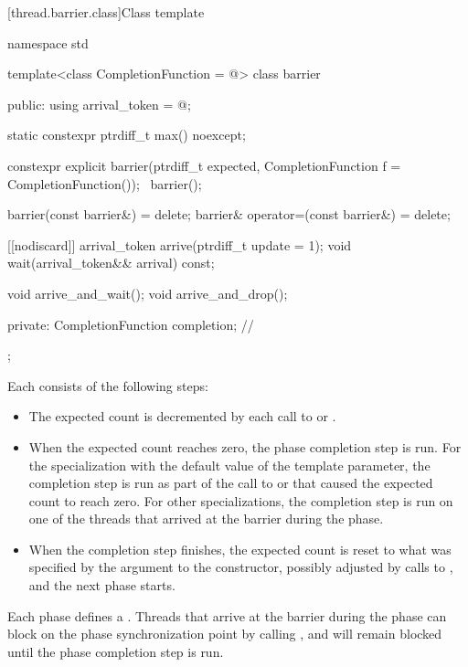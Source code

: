 [thread.barrier.class]{Class template }

\begin{codeblock}
namespace std {
  template<class CompletionFunction = @\seebelow@>
  class barrier {
  public:
    using arrival_token = @\seebelow@;

    static constexpr ptrdiff_t max() noexcept;

    constexpr explicit barrier(ptrdiff_t expected,
                               CompletionFunction f = CompletionFunction());
    ~barrier();

    barrier(const barrier&) = delete;
    barrier& operator=(const barrier&) = delete;

    [[nodiscard]] arrival_token arrive(ptrdiff_t update = 1);
    void wait(arrival_token&& arrival) const;

    void arrive_and_wait();
    void arrive_and_drop();

  private:
    CompletionFunction completion;      // \expos
  };
}
\end{codeblock}

\pnum
Each  consists of the following steps:
\begin{itemize}
\item
  The expected count is decremented
  by each call to  or .
\item
  When the expected count reaches zero, the phase completion step is run.
  For the specialization
  with the default value of the  template parameter,
  the completion step is run
  as part of the call to  or 
  that caused the expected count to reach zero.
  For other specializations,
  the completion step is run on one of the threads
  that arrived at the barrier during the phase.
\item
  When the completion step finishes,
  the expected count is reset
  to what was specified by the  argument to the constructor,
  possibly adjusted by calls to , and
  the next phase starts.
\end{itemize}

%
\pnum
{}%
Each phase defines a .
Threads that arrive at the barrier during the phase
can block on the phase synchronization point by calling , and
will remain blocked until the phase completion step is run.

